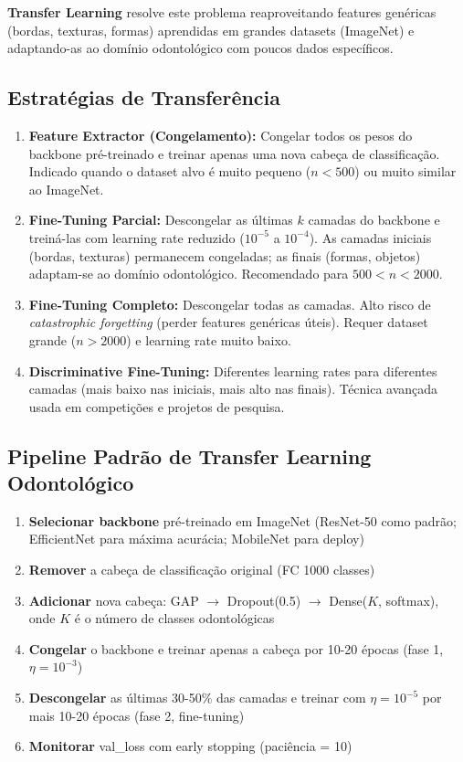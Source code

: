 \textbf{Transfer Learning} resolve este problema reaproveitando features genéricas
(bordas, texturas, formas) aprendidas em grandes datasets (ImageNet) e adaptando-as
ao domínio odontológico com poucos dados específicos.

\subsection{Estratégias de Transferência}

\begin{enumerate}
  \item \textbf{Feature Extractor (Congelamento):} Congelar todos os pesos do
        backbone pré-treinado e treinar apenas uma nova cabeça de classificação.
        Indicado quando o dataset alvo é muito pequeno ($n < 500$) ou muito similar
        ao ImageNet.

  \item \textbf{Fine-Tuning Parcial:} Descongelar as últimas $k$ camadas do backbone
        e treiná-las com learning rate reduzido ($10^{-5}$ a $10^{-4}$). As camadas
        iniciais (bordas, texturas) permanecem congeladas; as finais (formas,
        objetos) adaptam-se ao domínio odontológico. Recomendado para $500 < n < 2000$.

  \item \textbf{Fine-Tuning Completo:} Descongelar todas as camadas. Alto risco de
        \textit{catastrophic forgetting} (perder features genéricas úteis). Requer
        dataset grande ($n > 2000$) e learning rate muito baixo.

  \item \textbf{Discriminative Fine-Tuning:} Diferentes learning rates para
        diferentes camadas (mais baixo nas iniciais, mais alto nas finais).
        Técnica avançada usada em competições e projetos de pesquisa.
\end{enumerate}

\subsection{Pipeline Padrão de Transfer Learning Odontológico}

\begin{enumerate}
  \item \textbf{Selecionar backbone} pré-treinado em ImageNet (ResNet-50 como
        padrão; EfficientNet para máxima acurácia; MobileNet para deploy)
  \item \textbf{Remover} a cabeça de classificação original (FC 1000 classes)
  \item \textbf{Adicionar} nova cabeça: GAP $\to$ Dropout(0.5) $\to$
        Dense($K$, softmax), onde $K$ é o número de classes odontológicas
  \item \textbf{Congelar} o backbone e treinar apenas a cabeça por 10-20 épocas
        (fase 1, $\eta = 10^{-3}$)
  \item \textbf{Descongelar} as últimas 30-50\% das camadas e treinar com
        $\eta = 10^{-5}$ por mais 10-20 épocas (fase 2, fine-tuning)
  \item \textbf{Monitorar} val\_loss com early stopping (paciência = 10)
\end{enumerate}

